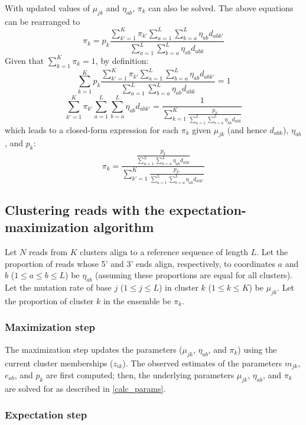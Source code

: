 \documentclass[../../MainTexts/main.tex]{subfiles}
\begin{document}
With updated values of $\mu_{jk}$ and $\eta_{ab}$, $\pi_k$ can also be solved.
The above equations can be rearranged to
$$\pi_k = p_k \frac{\sum_{k'=1}^{K} \pi_{k'} \sum_{a=1}^{L} \sum_{b=a}^{L} \eta_{ab} d_{abk'}}{\sum_{a=1}^{L} \sum_{b=a}^{L} \eta_{ab} d_{abk}}$$
Given that $\sum_{k=1}^{K} \pi_k = 1$, by definition:
$$\sum_{k=1}^{K} p_k \frac{\sum_{k'=1}^{K} \pi_{k'} \sum_{a=1}^{L} \sum_{b=a}^{L} \eta_{ab} d_{abk'}}{\sum_{a=1}^{L} \sum_{b=a}^{L} \eta_{ab} d_{abk}} = 1$$
$$\sum_{k'=1}^{K} \pi_{k'} \sum_{a=1}^{L} \sum_{b=a}^{L} \eta_{ab} d_{abk'} = \frac{1}{\sum_{k=1}^{K} \frac{p_k}{\sum_{a=1}^{L} \sum_{b=a}^{L} \eta_{ab} d_{abk}}}$$
which leads to a closed-form expression for each $\pi_k$ given $\mu_{jk}$ (and hence $d_{abk}$), $\eta_{ab}$, and $p_k$:
$$\pi_k = \frac{\frac{p_k}{ \sum_{a=1}^{L} \sum_{b=a}^{L} \eta_{ab} d_{abk}}}{\sum_{k'=1}^{K} \frac{p_{k'}}{\sum_{a=1}^{L} \sum_{b=a}^{L} \eta_{ab} d_{abk'}}}$$


\subsection{Clustering reads with the expectation-maximization algorithm}

Let $N$ reads from $K$ clusters align to a reference sequence of length $L$.
Let the proportion of reads whose 5' and 3' ends align, respectively, to coordinates $a$ and $b$ ($1 \le a \le b \le L$) be $\eta_{ab}$ (assuming these proportions are equal for all clusters).
Let the mutation rate of base $j$ ($1 \le j \le L$) in cluster $k$ ($1 \le k \le K$) be $\mu_{jk}$.
Let the proportion of cluster $k$ in the ensemble be $\pi_k$.

\subsubsection{Maximization step}

The maximization step updates the parameters ($\mu_{jk}$, $\eta_{ab}$, and $\pi_k$) using the current cluster memberships ($z_{ik}$).
The observed estimates of the parameters $m_{jk}$, $e_{ab}$, and $p_k$ are first computed; then, the underlying parameters $\mu_{jk}$, $\eta_{ab}$, and $\pi_k$ are solved for as described in \ref{calc_params}.

\subsubsection{Expectation step}
\end{document}
